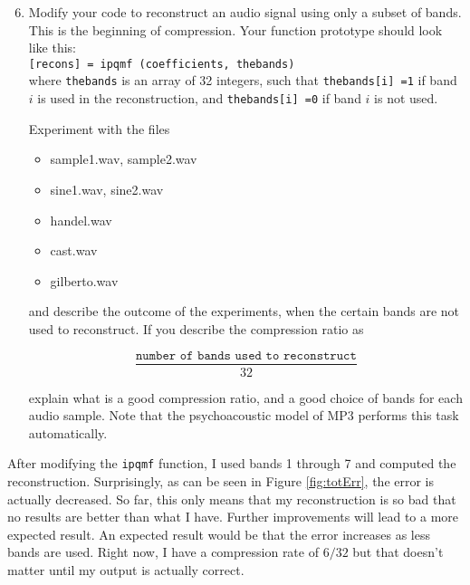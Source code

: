 \documentclass{article} %
\begin{document}



\begin{framed}
\begin{enumerate}
\setcounter{enumi}{5}
\item Modify your code to reconstruct an audio signal using only a subset
of bands. This is the beginning of compression. Your function prototype
should look like this: 
\\[2ex]
\verb|[recons] = ipqmf (coefficients, thebands)|
\\[2ex]

where \verb|thebands| is an array of 32 integers, such that
\verb|thebands[i] =1| if band $i$ is used in the reconstruction, and
\verb|thebands[i] =0| if band $i$ is not used. 

Experiment with the files

\begin{itemize}
\item sample1.wav, sample2.wav
\item sine1.wav, sine2.wav
\item handel.wav
\item cast.wav
\item gilberto.wav
\end{itemize}

and describe the outcome of the experiments, when the certain bands are
not used to reconstruct. If you describe the compression ratio as

\begin{equation}
\frac{\texttt{number of bands used to reconstruct}}{32}
\end{equation}

explain what is a good compression ratio, and a good choice of bands for
each audio sample. Note that the psychoacoustic model of MP3 performs
this task automatically. 
\end{enumerate}
\end{framed}


After modifying the \verb|ipqmf| function, I used bands 1 through 7 and computed the reconstruction. 
Surprisingly, as can be seen in Figure \ref{fig:totErr}, the error is actually decreased. So far, this only
means that my reconstruction is so bad that no results are better than what I have. Further improvements
will lead to a more expected result. An expected result would be that the error increases as less bands are used. 
Right now, I have a compression rate of $6/32$ but that doesn't matter until my output is actually correct. 
\end{document}
